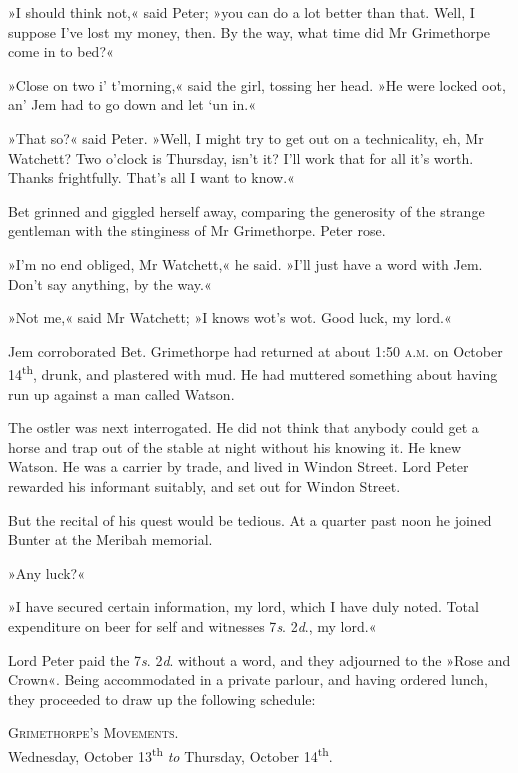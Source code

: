 »I should think not,« said Peter; »you can do a lot better than that. Well, I suppose I've lost my money, then. By the way, what time did Mr Grimethorpe come in to bed?«

»Close on two i' t'morning,« said the girl, tossing her head. »He were locked oot, an' Jem had to go down and let `un in.«

»That so?« said Peter. »Well, I might try to get out on a technicality, eh, Mr Watchett? Two o'clock is Thursday, isn't it? I'll work that for all it's worth. Thanks frightfully. That's all I want to know.«

Bet grinned and giggled herself away, comparing the generosity of the strange gentleman with the stinginess of Mr Grimethorpe. Peter rose.

»I'm no end obliged, Mr Watchett,« he said. »I'll just have a word with Jem. Don't say anything, by the way.«

»Not me,« said Mr Watchett; »I knows wot's wot. Good luck, my lord.«

Jem corroborated Bet. Grimethorpe had returned at about 1:50 \textsc{a.m.} on October 14\textsuperscript{th}, drunk, and plastered with mud. He had muttered something about having run up against a man called Watson.

The ostler was next interrogated. He did not think that anybody could get a horse and trap out of the stable at night without his knowing it. He knew Watson. He was a carrier by trade, and lived in Windon Street. Lord Peter rewarded his informant suitably, and set out for Windon Street.

But the recital of his quest would be tedious. At a quarter past noon he joined Bunter at the Meribah memorial.

»Any luck?«

»I have secured certain information, my lord, which I have duly noted. Total expenditure on beer for self and witnesses 7\textit{s}. 2\textit{d}., my lord.«

Lord Peter paid the 7\textit{s}. 2\textit{d}. without a word, and they adjourned to the »Rose and Crown«. Being accommodated in a private parlour, and having ordered lunch, they proceeded to draw up the following schedule:

\makeatletter
{}
{%
\clearpage
}{%

}
\makeatother

\begin{center}
\textsc{Grimethorpe's Movements.}\\Wednesday, October 13\textsuperscript{th} \textit{to} Thursday, October 14\textsuperscript{th}.
\end{center}

